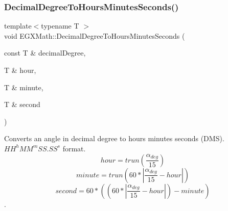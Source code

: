 \subsubsection{\texorpdfstring{Decimal\+Degree\+To\+Hours\+Minutes\+Seconds()}{DecimalDegreeToHoursMinutesSeconds()}}
{\footnotesize\ttfamily template$<$typename T $>$ \\
void E\+G\+X\+Math\+::\+Decimal\+Degree\+To\+Hours\+Minutes\+Seconds (\begin{DoxyParamCaption}\item[{const T \&}]{decimal\+Degree,  }\item[{T \&}]{hour,  }\item[{T \&}]{minute,  }\item[{T \&}]{second }\end{DoxyParamCaption})}



Converts an angle in decimal degree to hours minutes seconds (D\+MS). ${HH}^{h}{MM}^{m}{SS.SS}^{s}$ format. \[hour=trun(\frac{\alpha_{deg}}{15})\] \[minute=trun(60 * |\frac{\alpha_{deg}}{15} - hour|)\] \[second=60 * ((60 * |\frac{\alpha_{deg}}{15} - hour|)-minute)\]. 

